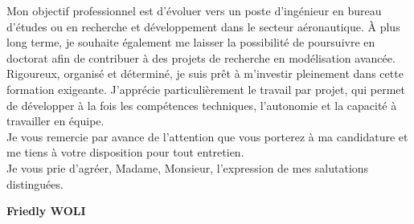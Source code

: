 \documentclass[11pt,a4paper]{article}
\begin{document}
			Mon objectif professionnel est d’évoluer vers un poste d’ingénieur en bureau d’études ou en recherche et développement dans le secteur aéronautique. À plus long terme, je souhaite également me laisser la possibilité de poursuivre en doctorat afin de contribuer à des projets de recherche en modélisation avancée.\\
			
			Rigoureux, organisé et déterminé, je suis prêt à m’investir pleinement dans cette formation exigeante. J’apprécie particulièrement le travail par projet, qui permet de développer à la fois les compétences techniques, l’autonomie et la capacité à travailler en équipe.\\
			
			Je vous remercie par avance de l’attention que vous porterez à ma candidature et me tiens à votre disposition pour tout entretien.\\
			
			Je vous prie d’agréer, Madame, Monsieur, l’expression de mes salutations distinguées.
			
		

	\vspace{0.8cm}






\begin{flushright}
	
	\textbf{Friedly WOLI}
\end{flushright}
\end{document}
